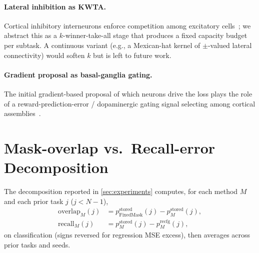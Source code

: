 \documentclass{article}
\theoremstyle{plain}
\theoremstyle{remark}
\begin{document}
\paragraph{Lateral inhibition as KWTA.}
Cortical inhibitory interneurons enforce competition among excitatory cells~\citep{maass2000computational,douglas2004neuronal,amari1977dynamics}; we abstract this as a $k$-winner-take-all stage that produces a fixed capacity budget per subtask. A continuous variant (e.g., a Mexican-hat kernel of $\pm$-valued lateral connectivity) would soften $k$ but is left to future work.

\paragraph{Gradient proposal as basal-ganglia gating.}
The initial gradient-based proposal of which neurons drive the loss plays the role of a reward-prediction-error / dopaminergic gating signal selecting among cortical assemblies~\citep{mink1996basal,schultz1997neural,oreilly2006making,rolls2010attractor}.

\section{Mask-overlap vs.\ Recall-error Decomposition}
\label{app:overlap_recall}

The decomposition reported in \cref{sec:experiments} computes, for each method $M$ and each prior task $j$ ($j<N{-}1$),
\begin{align*}
\mathrm{overlap}_M(j) &= p^{\mathrm{stored}}_{\mathrm{FixedMask}}(j) - p^{\mathrm{stored}}_M(j),\\
\mathrm{recall}_M(j)  &= p^{\mathrm{stored}}_M(j) - p^{\mathrm{recfg}}_M(j),
\end{align*}
on classification (signs reversed for regression MSE excess), then averages across prior tasks and seeds.
\end{document}
